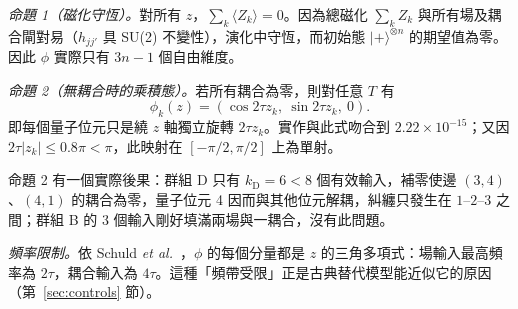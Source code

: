 \documentclass[10pt,a4paper]{article}
\begin{document}
\textit{命題 1（磁化守恆）。}對所有 $z$，$\sum_{k}\langle Z_k\rangle=0$。因為總磁化 $\sum_kZ_k$ 與所有場及耦合閘對易（$h_{jj'}$ 具 SU(2) 不變性），演化中守恆，而初始態 $|{+}\rangle^{\otimes n}$ 的期望值為零。因此 $\phi$ 實際只有 $3n-1$ 個自由維度。

\textit{命題 2（無耦合時的乘積態）。}若所有耦合為零，則對任意 $T$ 有
\begin{equation}
    \phi_k(z)=(\cos 2\tau z_k,\ \sin 2\tau z_k,\ 0).
    \label{eq:product-limit}
\end{equation}
即每個量子位元只是繞 $z$ 軸獨立旋轉 $2\tau z_k$。實作與此式吻合到 $2.22\times10^{-15}$；又因 $2\tau|z_k|\le0.8\pi<\pi$，此映射在 $[-\pi/2,\pi/2]$ 上為單射。

命題 2 有一個實際後果：群組 D 只有 $k_{\mathrm{D}}=6<8$ 個有效輸入，補零使邊 $(3,4)$、$(4,1)$ 的耦合為零，量子位元 4 因而與其他位元解耦，糾纏只發生在 $1$--$2$--$3$ 之間；群組 B 的 3 個輸入剛好填滿兩場與一耦合，沒有此問題。

\textit{頻率限制。}依 Schuld \textit{et al.}~\cite{schuld2021effect}，$\phi$ 的每個分量都是 $z$ 的三角多項式：場輸入最高頻率為 $2\tau$，耦合輸入為 $4\tau$。這種「頻帶受限」正是古典替代模型能近似它的原因（第~\ref{sec:controls} 節）。
\end{document}
